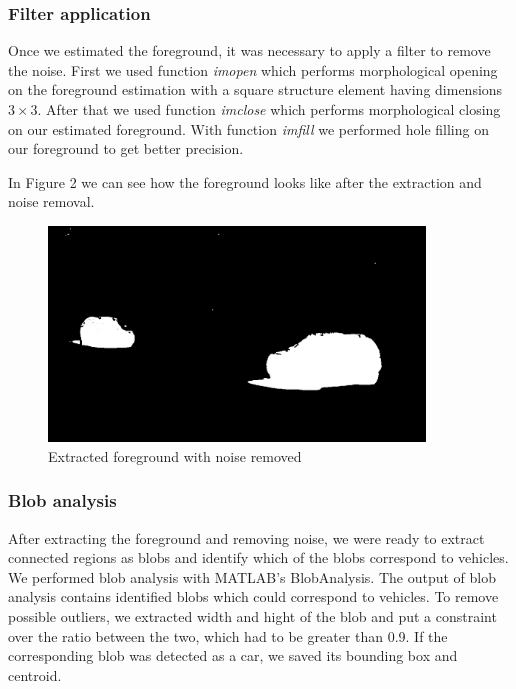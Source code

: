 \documentclass[12pt]{article} %
\begin{document}
\subsubsection{Filter application}

Once we estimated the foreground, it was necessary to apply a filter to remove the noise. First we used function \textit{imopen} which performs morphological opening on the foreground estimation with a square structure element having dimensions $3\times3$. After that we used function \textit{imclose} which performs morphological closing on our estimated foreground. With function \textit{imfill} we performed hole filling on our foreground to get better precision.

In Figure 2 we can see how the foreground looks like after the extraction and noise removal.

\begin{figure}[ht]
\centering
\includegraphics[width=10cm]{images/foreground.png}
\caption{Extracted foreground with noise removed}
\end{figure}

\subsubsection{Blob analysis}

After extracting the foreground and removing noise, we were ready to extract connected regions as blobs and identify which of the blobs correspond to vehicles. We performed blob analysis with MATLAB's BlobAnalysis. The output of blob analysis contains identified blobs which could correspond to vehicles. To remove possible outliers, we extracted width and hight of the blob and put a constraint over the ratio between the two, which had to be greater than 0.9. If the corresponding blob was detected as a car, we saved its bounding box and centroid.
\end{document}
